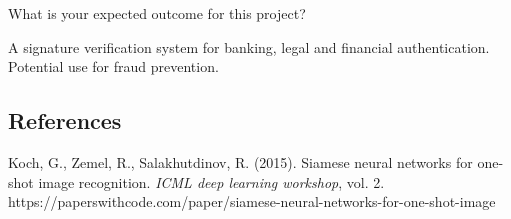 \documentclass[11pt]{article}
\begin{document}
What is your expected outcome for this project?
    \begin{itemize}
        A signature verification system for banking, legal and financial authentication. Potential use for fraud prevention.
    \end{itemize}

\subsection{References}
\begin{itemize}
      Koch, G., Zemel, R., Salakhutdinov, R. (2015). Siamese neural networks for one-shot image recognition. \textit{ICML deep learning workshop}, vol. 2. https://paperswithcode.com/paper/siamese-neural-networks-for-one-shot-image
  \end{itemize}
\end{document}
